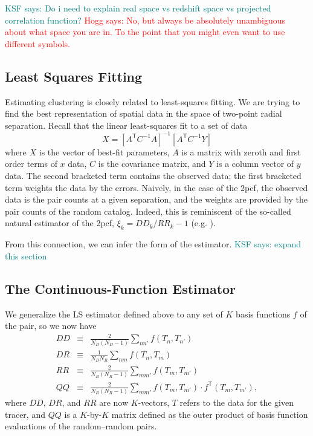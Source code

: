 \documentclass[modern]{aastex62}
\newcommand{\cf}{2pcf\xspace} %
\newcommand{\Est}{The Continuous-Function Estimator\xspace}
\newcommand{\LS}{LS\xspace}
\newcommand{\inv}{^{-1}}
\newcommand{\T}{^{\mathsf{T}}}
\newcommand{\KSF}[1]{\textcolor{teal}{KSF says: #1}}
\newcommand{\hogg}[1]{\textcolor{red}{Hogg says: #1}}
\begin{document}
\KSF{Do i need to explain real space vs redshift space vs projected correlation function?} \hogg{No, but always be absolutely unambiguous about what space you are in. To the point that you might even want to use different symbols.}

\subsection{Least Squares Fitting}

Estimating clustering is closely related to least-squares fitting.
We are trying to find the best representation of spatial data in the space of two-point radial separation.
Recall that the linear least-squares fit to a set of data 
\begin{equation}
X = [A\T C\inv A]\inv [A\T C\inv Y]
\end{equation}
where $X$ is the vector of best-fit parameters, $A$ is a matrix with zeroth and first order terms of $x$ data, $C$ is the covariance matrix, and $Y$ is a column vector of $y$ data.
The second bracketed term contains the observed data; the first bracketed term weights the data by the errors.
Naively, in the case of the \cf, the observed data is the pair counts at a given separation, and the weights are provided by the pair counts of the random catalog.
Indeed, this is reminiscent of the so-called natural estimator of the \cf, $\xi_k = DD_k/RR_k - 1$ (e.g. \citealt{Kerscher2000}).

From this connection, we can infer the form of the estimator.
\KSF{expand this section}

\subsection{\Est}
\label{sec:est}

We generalize the \LS estimator defined above to any set of $K$ basis functions $f$ of the pair, so we now have
\begin{eqnarray}\displaystyle
DD &\equiv& \frac{2}{N_D(N_D-1)} \sum_{n n'} f(T_n, T_{n'}) \\
DR &\equiv& \frac{1}{N_D N_R} \sum_{n m} f(T_n, T_{m}) \\
RR &\equiv& \frac{2}{N_R(N_R-1)} \sum_{m m'} f(T_m, T_{m'}) \\
QQ &\equiv& \frac{2}{N_R(N_R-1)} \sum_{m m'} f(T_m, T_{m'}) \cdot f\T(T_m, T_{m'}), \label{eq:qq_proj}
\end{eqnarray}
where $DD$, $DR$, and $RR$ are now $K$-vectors, $T$ refers to the data for the given tracer, and $QQ$ is a $K$-by-$K$ matrix defined as the outer product of basis function evaluations of the random--random pairs.
\end{document}
